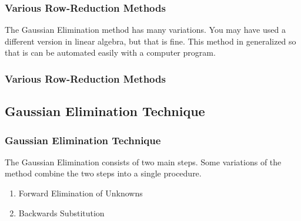 \documentclass[fleqn]{beamer} %
\newcommand{\sectionIVsubsectionItitle}{Various Row-Reduction Methods}
\newcommand{\sectionIVsubsectionIItitle}{Gaussian Elimination Technique}
\begin{document}
			\begin{frame}
				\frametitle{\sectionIVsubsectionItitle}
				\bigskip

				The Gaussian Elimination method has many variations.  You may have used a different version in linear algebra, but that is fine. This method in generalized so that is can be automated easily with a computer program.   

				\btVFill
			\end{frame}

			\begin{frame}
				\frametitle{\sectionIVsubsectionItitle}
				\bigskip


				\btVFill
			\end{frame}

		\subsection{\sectionIVsubsectionIItitle}\label{sectionIVsubsectionII}

			\begin{frame}
				\frametitle{\sectionIVsubsectionIItitle}
				\bigskip

					The Gaussian Elimination consists of two main steps. Some variations of the method combine the two steps into a single procedure. \vspace{10mm}
  
			  	\begin{enumerate}

			    	\item Forward Elimination of Unknowns
			    
			    	\item Backwards Substitution   
			  
			  	\end{enumerate} 


				\btVFill
			\end{frame}
\end{document}
